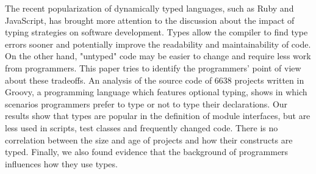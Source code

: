The recent popularization of dynamically typed languages, such as Ruby and JavaScript, has brought more attention to the discussion about the impact of typing strategies on software development.
Types allow the compiler to find type errors sooner and potentially improve the readability and maintainability of code.
On the other hand, "untyped" code may be easier to change and require less work from programmers.
This paper tries to identify the programmers' point of view about these tradeoffs.
An analysis of the source code of 6638 projects written in Groovy, a programming language which features optional typing, shows in which scenarios programmers prefer to type or not to type their declarations. 
Our results show that types are popular in the definition of module interfaces, but are less used in scripts, test classes and frequently changed code.
There is no correlation between the size and age of projects and how their constructs are typed.
Finally, we also found evidence that the background of programmers influences how they use types.

